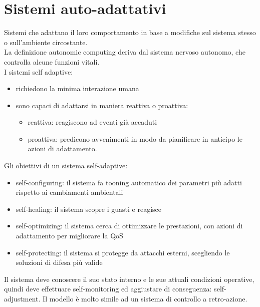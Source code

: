 \documentclass[16px]{article}
\begin{document}
\section{Sistemi auto-adattativi}
Sistemi che adattano il loro comportamento in base a modifiche sul sistema stesso o sull'ambiente circostante.\\ La definizione autonomic computing deriva dal sistema nervoso autonomo, che controlla alcune funzioni vitali.\\ I sistemi self adaptive:
\begin{itemize}
\item richiedono la minima interazione umana
\item sono capaci di adattarsi in maniera reattiva o proattiva:
\begin{itemize}
\item reattiva: reagiscono ad eventi già accaduti
\item proattiva: predicono avvenimenti in modo da pianificare in anticipo le azioni di adattamento.
\end{itemize}
\end{itemize}
Gli obiettivi di un sistema self-adaptive:
\begin{itemize}
\item self-configuring: il sistema fa tooning automatico dei parametri più adatti rispetto ai cambiamenti ambientali
\item self-healing: il sistema scopre i guasti e reagisce
\item self-optimizing: il sistema cerca di ottimizzare le prestazioni, con azioni di adattamento per migliorare la QoS
\item self-protecting: il sistema si protegge da attacchi esterni, scegliendo le soluzioni di difesa più valide 
\end{itemize}
Il sistema deve conoscere il suo stato interno e le sue attuali condizioni operative, quindi deve effettuare self-monitoring ed aggiustare di conseguenza: self-adjustment. Il modello è molto simile ad un sistema di controllo a retro-azione.
\end{document}
